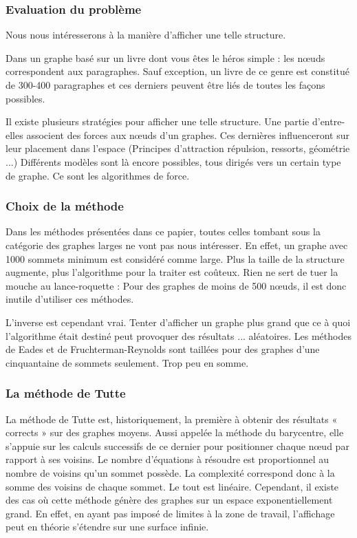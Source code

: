 \documentclass[a4paper,12pt]{article}
\begin{document}
\subsubsection{Evaluation du problème}

Nous nous intéresserons à la manière d’afficher une telle structure.

Dans un graphe basé sur un livre dont vous êtes le héros simple : les nœuds correspondent aux paragraphes. Sauf exception, un livre de ce genre est constitué de 300-400 paragraphes et ces derniers peuvent être liés de toutes les façons possibles.

Il existe plusieurs stratégies pour afficher une telle structure. Une partie d’entre-elles associent des forces aux nœuds d’un graphes. Ces dernières influenceront sur leur placement dans l’espace (Principes d’attraction répulsion, ressorts, géométrie ...) Différents modèles sont là encore possibles, tous dirigés vers un certain type de graphe. Ce sont les algorithmes de force.

\subsubsection{Choix de la méthode}

Dans les méthodes présentées dans ce papier, toutes celles tombant sous la catégorie des graphes larges ne vont pas nous intéresser. En effet, un graphe avec 1000 sommets minimum est considéré comme large. Plus la taille de la structure augmente, plus l’algorithme pour la traiter est coûteux. Rien ne sert de tuer la mouche au lance-roquette : Pour des graphes de moins de 500 nœuds, il est donc inutile d’utiliser ces méthodes.

L’inverse est cependant vrai. Tenter d’afficher un graphe plus grand que ce à quoi l’algorithme était destiné peut provoquer des résultats ... aléatoires. Les méthodes de Eades et de Fruchterman-Reynolds sont taillées pour des graphes d’une cinquantaine de sommets seulement. Trop peu en somme.

\subsubsection{La méthode de Tutte}

La méthode de Tutte est, historiquement, la première à obtenir des résultats « corrects » sur des graphes moyens. Aussi appelée la méthode du barycentre, elle s’appuie sur les calculs successifs de ce dernier pour positionner chaque nœud par rapport à ses voisins. Le nombre d’équations à résoudre est proportionnel au nombre de voisins qu’un sommet possède. La complexité correspond donc à la somme des voisins de chaque sommet. Le tout est linéaire. Cependant, il existe des cas où cette méthode génère des graphes sur un espace exponentiellement grand. En effet, en ayant pas imposé de limites à la zone de travail, l’affichage peut en théorie s’étendre sur une surface infinie.
\end{document}
